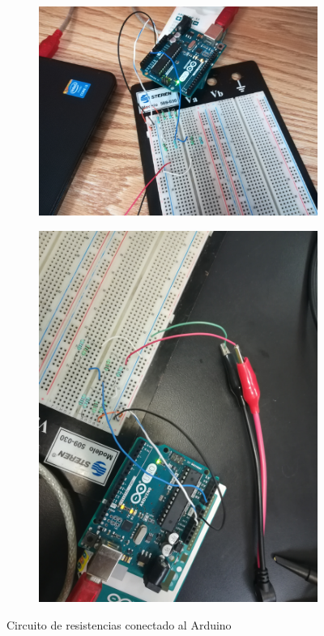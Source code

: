 \documentclass{article}
\begin{document}
\begin{figure}[h]
\begin{subfigure}{0.5\textwidth}
\centering
\includegraphics[scale=0.04]{Cir1.jpg}
\end{subfigure}
\begin{subfigure}{0.5\textwidth}
\centering
\includegraphics[scale=0.04]{Cir2.jpg}
\end{subfigure}
\caption{Circuito de resistencias conectado al Arduino}
\end{figure}
\lstset{
	inputencoding=utf8/latin1,
	breaklines=true}
\end{document}
